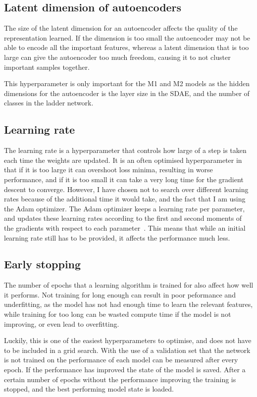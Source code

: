 \documentclass[12pt,a4paper,twoside,openright]{report}
\begin{document}
\subsection{Latent dimension of autoencoders}
The size of the latent dimension for an autoencoder affects the quality of the representation learned. If the dimension is too small the 
autoencoder may not be able to encode all the important features, whereas a latent dimension that is too large can give the autoencoder 
too much freedom, causing it to not cluster important samples together.

This hyperparameter is only important for the M1 and M2 models as the hidden dimensions for the autoencoder is the layer size in the SDAE,
and the number of classes in the ladder network.

\subsection{Learning rate}
The learning rate is a hyperparameter that controls how large of a step is taken each time the weights are updated. It is an often
optimised hyperparameter in that if it is too large it can overshoot loss minima, resulting in worse performance, and if it is too 
small it can take a very long time for the gradient descent to converge. However, I have chosen not to search over different learning 
rates because of the additional time it would take, and the fact that I am using the Adam optimizer. The Adam optimizer keeps a 
learning rate per parameter, and updates these learning rates according to the first and second moments of the gradients with respect to each 
parameter~\cite{DBLP:journals/corr/KingmaB14}. This means that while an initial learning rate still has to be provided, it affects the 
performance much less.

\subsection{Early stopping}
The number of epochs that a learning algorithm is trained for also affect how well it performs. Not training for long enough can result in
poor peformance and underfitting, as the model has not had enough time to learn the relevant features, while training for too long can
be wasted compute time if the model is not improving, or even lead to overfitting.

Luckily, this is one of the easiest hyperparameters to optimise, and does not have to be included in a grid search. 
With the use of a validation set that the network is not trained on the performance of each model can be measured after every epoch. 
If the performance has improved the state of the model is saved. After a certain number of epochs without the performance improving 
the training is stopped, and the best performing model state is loaded.
\end{document}
